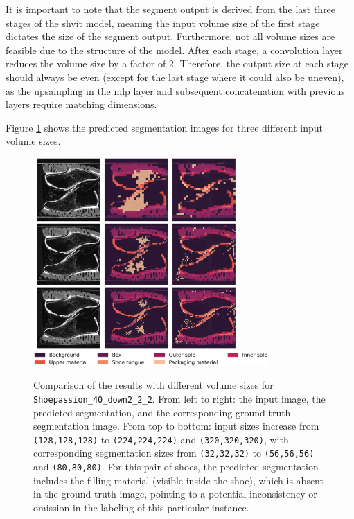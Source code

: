 It is important to note that the segment output is derived from the last three stages of the \gls{shvit} model, meaning the input volume size of the first stage dictates the size of the segment output. Furthermore, not all volume sizes are feasible due to the structure of the model. After each stage, a convolution layer reduces the volume size by a factor of 2. Therefore, the output size at each stage should always be even (except for the last stage where it could also be uneven), as the upsampling in the \gls{mlp} layer and subsequent concatenation with previous layers require matching dimensions.

\medskip

Figure \ref{comparison_segmentations_for_different_volume_sizes} shows the predicted segmentation images for three different input volume sizes.

\begin{figure}[H]
	\centering
	\includegraphics[width=0.7\textwidth]{./images/Shoepassion_40_down2_2_2_128-224-320.png}
	\includegraphics[width=0.8\textwidth]{./images/color_legend_7_classes_v2.png}
	\caption[Comparison of the results with different volume sizes]{Comparison of the results with different volume sizes for {\tt Shoepassion\_40\_down2\_2\_2}. From left to right: the input image, the predicted segmentation, and the corresponding ground truth segmentation image. From top to bottom: input sizes increase from {\tt (128,128,128)} to {\tt (224,224,224)} and {\tt (320,320,320)}, with corresponding segmentation sizes from {\tt (32,32,32)} to {\tt (56,56,56)} and {\tt (80,80,80)}. For this pair of shoes, the predicted segmentation includes the filling material (visible inside the shoe), which is absent in the ground truth image, pointing to a potential inconsistency or omission in the labeling of this particular instance.}
	\label{comparison_segmentations_for_different_volume_sizes}
\end{figure}

